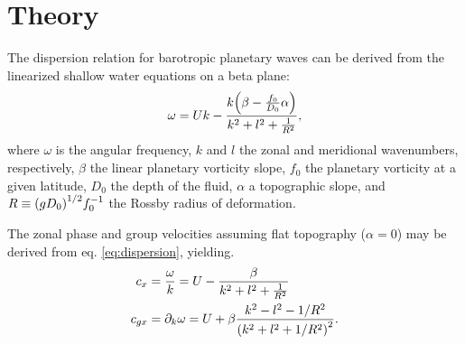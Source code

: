 \section{Theory}
\label{sec:theory}

The dispersion relation for barotropic planetary waves can be derived from the linearized shallow water equations on a beta plane:
	\begin{equation}
		\omega = Uk -\frac{k\qty(\beta - \frac{f_0}{D_0}\alpha)}{k^2 + l^2 + \frac{1}{R^2}},
		\label{eq:dispersion}
	\end{equation}
where $\omega$ is the angular frequency, $k$ and $l$ the zonal and meridional wavenumbers, respectively, $\beta $ the linear planetary vorticity slope, $ f_0 $ the planetary vorticity at a given latitude, $ D_0 $ the depth of the fluid, $ \alpha $ a topographic slope, and $R \equiv \qty(g D_0)^{1/2} f^{-1}_0$ the Rossby radius of deformation.

The zonal phase and group velocities assuming flat topography ($\alpha = 0$) may be derived from eq. \ref{eq:dispersion}, yielding.
	\begin{align}
		c_x &= \frac{\omega}{k} = U - \frac{\beta}{k^2 + l^2 + \frac{1}{R^2}} \label{eq:phasespeed} \\
		c_{gx} &= \partial_k \omega = U + \beta \frac{k^2 - l^2 - 1/R^2}{\qty(k^2 + l^2 + 1/R^2)^2}. \label{eq:groupvelocity}
	\end{align}
